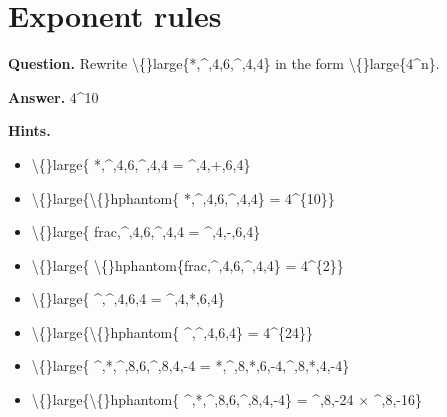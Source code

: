 \documentclass{article}
\begin{document}
\section*{Exponent rules}
\textbf{Question.} Rewrite \textbackslash\{\}large\{*,\textasciicircum{},4,6,\textasciicircum{},4,4\}
                    in the form \textbackslash\{\}large\{4\textasciicircum{}n\}.

\textbf{Answer.} 4\textasciicircum{}10

\textbf{Hints.}
\begin{itemize}
  \item \textbackslash\{\}large\{
                        *,\textasciicircum{},4,6,\textasciicircum{},4,4 = 
                        \textasciicircum{},4,+,6,4\}
  \item \textbackslash\{\}large\{\textbackslash\{\}hphantom\{
                        *,\textasciicircum{},4,6,\textasciicircum{},4,4\} = 
                        4\textasciicircum{}\{10\}\}
  \item \textbackslash\{\}large\{
                        frac,\textasciicircum{},4,6,\textasciicircum{},4,4 = 
                        \textasciicircum{},4,-,6,4\}
  \item \textbackslash\{\}large\{
                        \textbackslash\{\}hphantom\{frac,\textasciicircum{},4,6,\textasciicircum{},4,4\} = 
                        4\textasciicircum{}\{2\}\}
  \item \textbackslash\{\}large\{
                        \textasciicircum{},\textasciicircum{},4,6,4 = 
                        \textasciicircum{},4,*,6,4\}
  \item \textbackslash\{\}large\{\textbackslash\{\}hphantom\{
                        \textasciicircum{},\textasciicircum{},4,6,4\} =
                        4\textasciicircum{}\{24\}\}
  \item \textbackslash\{\}large\{
                        \textasciicircum{},*,\textasciicircum{},8,6,\textasciicircum{},8,4,-4 =
                        *,\textasciicircum{},8,*,6,-4,\textasciicircum{},8,*,4,-4\}
  \item \textbackslash\{\}large\{\textbackslash\{\}hphantom\{
                        \textasciicircum{},*,\textasciicircum{},8,6,\textasciicircum{},8,4,-4\} =
                        \textasciicircum{},8,-24 $\times$ \textasciicircum{},8,-16\}
\end{itemize}
\end{document}
